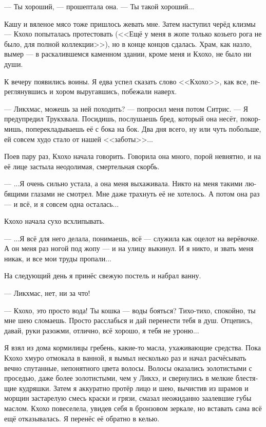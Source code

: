 \documentclass[a4paper,12pt,fleqn]{book}\usepackage{polyglossia}\setdefaultlanguage[babelshorthands=true]{russian}\setotherlanguage{english}\defaultfontfeatures{Ligatures=TeX,Mapping=tex-text}\usepackage{xcolor}\newcommand{\ml}[3]{#2}
\begin{document}
{--- Ты хороший, --- прошептала она. --- Ты такой хороший...

Кашу и вяленое мясо тоже пришлось жевать мне.
Затем наступил черёд клизмы --- Кхохо попыталась протестовать (<<Ещё у меня в жопе только козьего рога не было, для полной коллекции>>), но в конце концов сдалась.
Храм, как назло, вымер --- в раскалившемся каменном здании, кроме меня и Кхохо, не было ни души.

К вечеру появились воины.
Я едва успел сказать слово <<Кхохо>>, как все, переглянувшись и хором выругавшись, побежали наверх.

--- Ликхмас, можешь за ней походить? --- попросил меня потом Ситрис.
--- Я предупредил Трукхвала.
Посидишь, послушаешь бред, который она несёт, покормишь, поперекладываешь её с бока на бок.
Два дня всего, ну или чуть побольше, ей совсем худо стало от нашей <<заботы>>...

Поев пару раз, Кхохо начала говорить.
Говорила она много, порой невнятно, и на её лице застыла неодолимая, смертельная скорбь.

---  ...Я очень сильно устала, а она меня выхаживала.
Никто на меня такими любящими глазами не смотрел.
Мне даже трахнуть её не хотелось.
А потом она раз --- и всё, и я совсем одна осталась...

Кхохо начала сухо всхлипывать.

--- ...Я всё для него делала, понимаешь, всё --- служила как оцелот на верёвочке.
А он меня раз ногой под жопу --- и на улицу выкинул.
И я никто, и звать меня никак, и все мои труды пропали...

На следующий день я принёс свежую постель и набрал ванну.

--- Ликхмас, нет, ни за что!

--- Кхохо, это просто вода!
Ты кошка --- воды бояться?
Тихо-тихо, спокойно, ты мне шею сломаешь.
Просто расслабься и дай перенести тебя в душ.
Отцепись, давай, руки разожми, отлично, всё хорошо, я тебя не уроню...

Я взял из дома кормилицы гребень, какие-то масла, ухаживающие средства.
Пока Кхохо хмуро отмокала в ванной, я вымыл несколько раз и начал расчёсывать вечно спутанные, непонятного цвета волосы.
Волосы оказались золотистыми с проседью, даже более золотистыми, чем у Ликхэ, и свернулись в мелкие блестящие кудряшки.
Затем я аккуратно протёр лицо и шею, вычистив из шрамов и морщин застарелую смесь краски и грязи, смазал неожиданно заалевшие губы маслом.
Кхохо повеселела, увидев себя в бронзовом зеркале, но вставать сама всё ещё отказывалась.
Я перенёс её обратно в келью.

}
\end{document}
